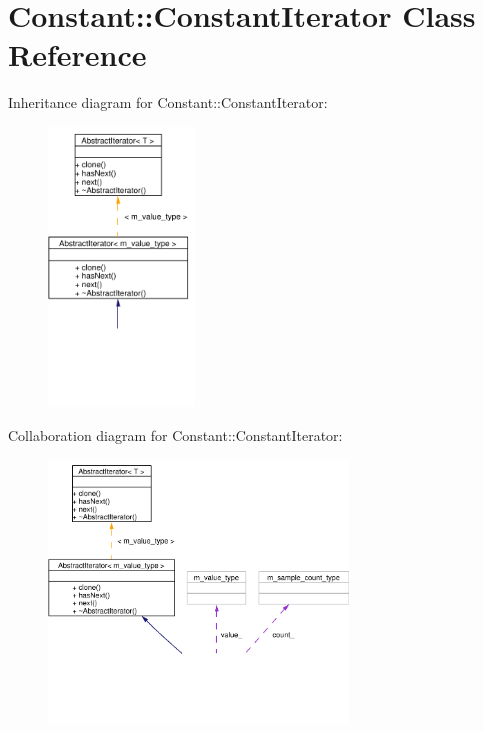 \hypertarget{classConstant_1_1ConstantIterator}{
\section{Constant::Constant\-Iterator Class Reference}
\label{classConstant_1_1ConstantIterator}
}
Inheritance diagram for Constant::Constant\-Iterator:\begin{figure}[H]
\begin{center}
\leavevmode
\includegraphics[width=110pt]{classConstant_1_1ConstantIterator__inherit__graph}
\end{center}
\end{figure}
Collaboration diagram for Constant::Constant\-Iterator:\begin{figure}[H]
\begin{center}
\leavevmode
\includegraphics[width=226pt]{classConstant_1_1ConstantIterator__coll__graph}
\end{center}
\end{figure}
